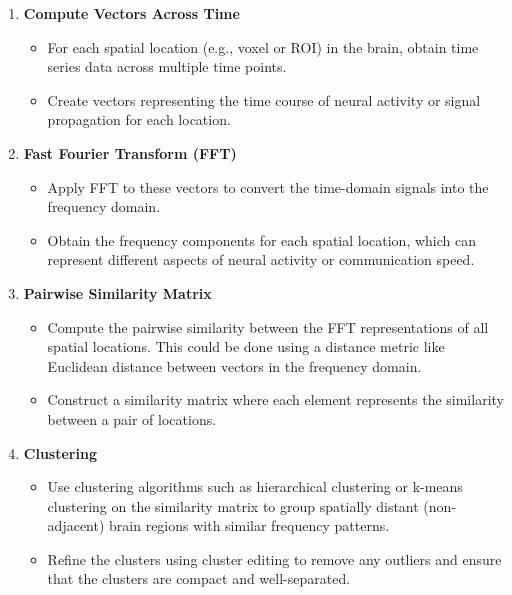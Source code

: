 \documentclass[twocolumn]{article}
\begin{document}
\begin{enumerate}
\item \textbf{Compute Vectors Across Time}
\begin{itemize}
\item For each spatial location (e.g., voxel or ROI) in the brain, obtain time series data across multiple time points.
\item Create vectors representing the time course of neural activity or signal propagation for each location.
\end{itemize}
\item \textbf{Fast Fourier Transform (FFT)}
\begin{itemize}
\item Apply FFT to these vectors to convert the time-domain signals into the frequency domain.
\item Obtain the frequency components for each spatial location, which can represent different aspects of neural activity or communication speed.
\end{itemize}
\item \textbf{Pairwise Similarity Matrix}
\begin{itemize}
\item Compute the pairwise similarity between the FFT representations of all spatial locations. This could be done using a distance metric like Euclidean distance between vectors in the frequency domain.
\item Construct a similarity matrix where each element represents the similarity between a pair of locations.
\end{itemize}
\item \textbf{Clustering}
\begin{itemize}
\item Use clustering algorithms such as hierarchical clustering or k-means clustering on the similarity matrix to group spatially distant (non-adjacent) brain regions with similar frequency patterns.
\item Refine the clusters using cluster editing to remove any outliers and ensure that the clusters are compact and well-separated.


\end{itemize}
\end{enumerate}
\end{document}
